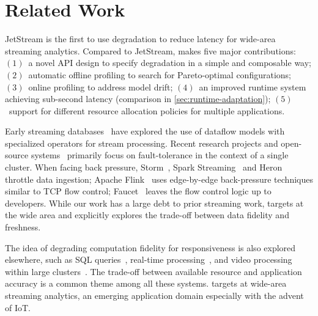 
\chapter{Related Work}
\label{cha:related-work}

 JetStream is the first to use degradation to reduce latency
for wide-area streaming analytics. Compared to JetStream, \sysname{} makes five
major contributions: $(1)$~a novel API design to specify degradation in a simple
and composable way; $(2)$~automatic offline profiling to search for
Pareto-optimal configurations; $(3)$~online profiling to address model drift;
$(4)$~an improved runtime system achieving sub-second latency (comparison in
\autoref{sec:runtime-adaptation}); $(5)$~support for different resource
allocation policies for multiple applications.

 Early streaming
databases~\cite{abadi2005design, chandrasekaran2003telegraphcq} have explored
the use of dataflow models with specialized operators for stream
processing. Recent research projects and open-source
systems~\cite{akidau2013millwheel, toshniwal2014storm, sanjeev2015twitter,
  zaharia2013discretized, carbone2015apache} primarily focus on fault-tolerance
in the context of a single cluster. When facing back pressure,
Storm~\cite{toshniwal2014storm}, Spark Streaming~\cite{zaharia2013discretized}
and Heron~\cite{sanjeev2015twitter} throttle data ingestion; Apache
Flink~\cite{carbone2015apache} uses edge-by-edge back-pressure techniques
similar to TCP flow control; Faucet~\cite{lattuada2016faucet} leaves the flow
control logic up to developers.  While our work has a large debt to prior
streaming work, \sysname{} targets at the wide area and explicitly explores the
trade-off between data fidelity and freshness.

 The idea of degrading computation fidelity for
responsiveness is also explored elsewhere, such as SQL
queries~\cite{hellerstein1997online, agarwal2013blinkdb,
  ananthanarayanan2014grass}, real-time processing~\cite{farrell2016meantime},
and video processing within large clusters~\cite{zhang2017live}. The trade-off
between available resource and application accuracy is a common theme among all
these systems. \sysname{} targets at wide-area streaming analytics, an emerging
application domain especially with the advent of IoT\@.


